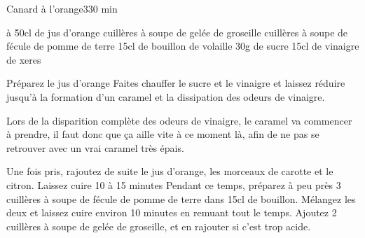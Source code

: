 \begin{recette}{Canard à l'orange}{3}{30 min}{}

\begin{ingredients}
 à 50cl de jus d'orange
 cuillères à soupe de gelée de groseille
 cuillères à soupe de fécule de pomme de terre
\ingredient 15cl de bouillon de volaille
\ingredient 30g de sucre
\ingredient 15cl de vinaigre de xeres
\end{ingredients}

\begin{preparation}
\etape Préparez le jus d'orange
\etape Faites chauffer le sucre et le vinaigre et laissez réduire jusqu'à la formation d'un caramel et la dissipation des odeurs de vinaigre.
\begin{attention}
Lors de la disparition complète des odeurs de vinaigre, le caramel va commencer à prendre, il faut donc que ça aille vite à ce moment là, afin de ne pas se retrouver avec un vrai caramel très épais. 
\end{attention}

\etape Une fois pris, rajoutez de suite le jus d'orange, les morceaux de carotte et le citron. Laissez cuire 10 à 15 minutes
\etape Pendant ce temps, préparez à peu près 3 cuillères à soupe de fécule de pomme de terre dans 15cl de bouillon.
\etape Mélangez les deux et laissez cuire environ 10 minutes en remuant tout le temps. 
\etape Ajoutez 2 cuillères à soupe de gelée de groseille, et en rajouter si c'est trop acide.
\end{preparation}
\end{recette}

